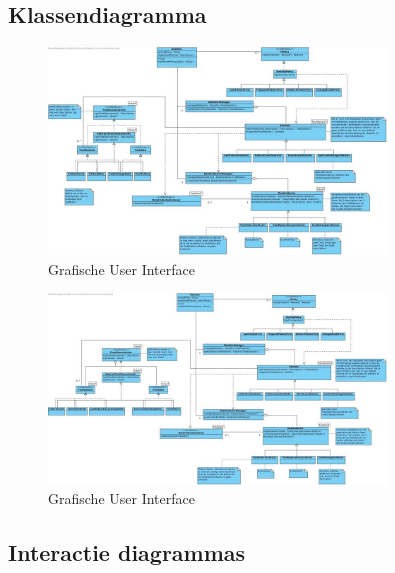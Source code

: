 \documentclass[i1]{oss}
\begin{document}
\subsection{Klassendiagramma}
\label{ssec:Klassendiagramma}



\begin{figure}[tbp]
\begin{center}
    \includegraphics[width=0.8\textwidth]{klassendiagramOud}
    \caption{Grafische User Interface}
	\label{fig:gui}
\end{center}
\end{figure}



\begin{figure}[tbp]
\begin{center}
    \includegraphics[width=0.8\textwidth]{klassendiagram}
    \caption{Grafische User Interface}
	\label{fig:gui}
\end{center}
\end{figure}

\subsection{Interactie diagrammas}
\label{ssec:Interactiedia}
\end{document}
